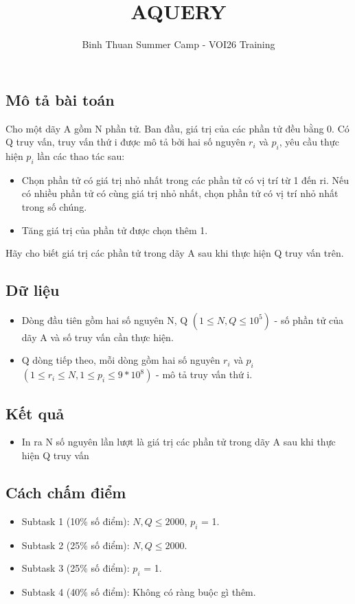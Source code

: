 \documentclass[12pt]{article}
\begin{document}
\title{AQUERY}
\author{Binh Thuan Summer Camp - VOI26 Training}
\maketitle

\setlength{\parindent}{0pt}
\setlength{\parskip}{1em} 

\subsection*{Mô tả bài toán}
Cho một dãy A gồm N phần tử. Ban đầu, giá trị của các phần tử đều bằng 0. Có Q truy vấn,
truy vấn thứ i được mô tả bởi hai số nguyên $r_i$ và $p_i$, yêu cầu thực hiện $p_i$ lần các thao tác sau:
\begin{itemize}
  \item Chọn phần tử có giá trị nhỏ nhất trong các phần tử có vị trí từ 1 đến ri. Nếu có nhiều phần
  tử có cùng giá trị nhỏ nhất, chọn phần tử có vị trí nhỏ nhất trong số chúng.
  \item Tăng giá trị của phần tử được chọn thêm 1.
\end{itemize}
Hãy cho biết giá trị các phần tử trong dãy A sau khi thực hiện Q truy vấn trên.

\subsection*{Dữ liệu}
\begin{itemize}
  \item Dòng đầu tiên gồm hai số nguyên N, Q $(1 \leq N, Q \leq 10^5)$ - số phần tử của dãy A và số truy
  vấn cần thực hiện.
  \item Q dòng tiếp theo, mỗi dòng gồm hai số nguyên $r_i$ và $p_i$ $(1 \leq r_i \leq N, 1 \leq p_i \leq 9 * 10^8)$ - mô tả truy vấn thứ i.
\end{itemize}

\subsection*{Kết quả}
\begin{itemize}
  \item In ra N số nguyên lần lượt là giá trị các phần tử trong dãy A sau khi thực hiện Q truy vấn
\end{itemize}

\subsection*{Cách chấm điểm} 
\begin{itemize}
  \item Subtask 1 (10\% số điểm): $N, Q \leq 2000$, $p_i$ = 1.
  \item Subtask 2 (25\% số điểm): $N, Q \leq 2000$.
  \item Subtask 3 (25\% số điểm): $p_i$ = 1.
  \item Subtask 4 (40\% số điểm): Không có ràng buộc gì thêm.
\end{itemize}
\end{document}
